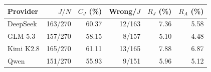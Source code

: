 \begin{tabular*}{\linewidth}{@{\extracolsep{\fill}}lrrrrr@{}}
\toprule
Provider & $J/N$ & $C_J$ (\%) & Wrong/$J$ & $R_J$ (\%) & $R_A$ (\%) \\
\midrule
DeepSeek & 163/270 & 60.37 & 12/163 & 7.36 & 5.58 \\
GLM-5.3 & 157/270 & 58.15 & 8/157 & 5.10 & 4.48 \\
Kimi K2.8 & 165/270 & 61.11 & 13/165 & 7.88 & 6.87 \\
Qwen & 151/270 & 55.93 & 9/151 & 5.96 & 5.12 \\
\bottomrule
\end{tabular*}
